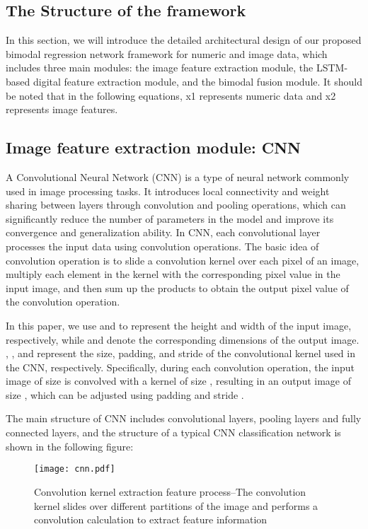 \documentclass{ecai}
\begin{document}
\subsection{The Structure of the framework}
In this section, we will introduce the detailed architectural design of our proposed bimodal regression network framework for numeric and image data, which includes three main modules: the image feature extraction module, the LSTM-based digital feature extraction module, and the bimodal fusion module. It should be noted that in the following equations, x1 represents numeric data and x2 represents image features.

\subsection{Image feature extraction module: CNN}
A Convolutional Neural Network (CNN) \cite{lecun1998gradient} is a type of neural network commonly used in image processing tasks. It introduces local connectivity and weight sharing between layers through convolution and pooling operations, which can significantly reduce the number of parameters in the model and improve its convergence and generalization ability. In CNN, each convolutional layer processes the input data using convolution operations. The basic idea of convolution operation is to slide a convolution kernel over each pixel of an image, multiply each element in the kernel with the corresponding pixel value in the input image, and then sum up the products to obtain the output pixel value of the convolution operation.

In this paper, we use  and  to represent the height and width of the input image, respectively, while  and  denote the corresponding dimensions of the output image. , , and  represent the size, padding, and stride of the convolutional kernel used in the CNN, respectively. Specifically, during each convolution operation, the input image of size  is convolved with a kernel of size , resulting in an output image of size , which can be adjusted using padding  and stride .






 The main structure of CNN includes convolutional layers, pooling layers and fully connected layers, and the structure of a typical CNN classification network is shown in the following figure:
 
\begin{figure}
\centering
\texttt{[image: cnn.pdf]}
\caption{Convolution kernel extraction feature process--The convolution kernel slides over different partitions of the image and performs a convolution calculation to extract feature information}
\end{figure}
\end{document}
